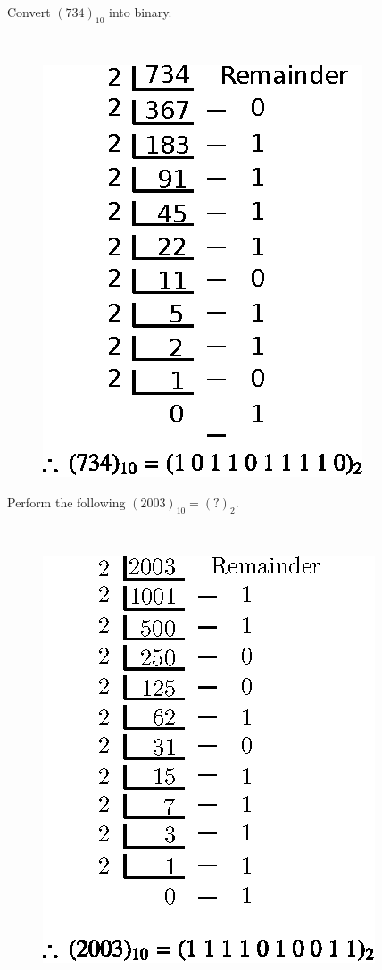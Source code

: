\begin{problem}\label{prob5.4}
Convert $(734)_{10}$ into binary.
\end{problem}

\begin{solution}
~
\begin{figure}[H]
\centering
\includegraphics[scale=.9]{chap5/div3.eps}
\end{figure}
\end{solution}

\begin{problem}\label{prob5.5}
Perform the following $(2003)_{10}=(?)_{2}$.
\end{problem}

\begin{solution}
~
\begin{figure}[H]
\centering
\includegraphics[scale=1.05]{chap5/div4.eps}
\end{figure}
\end{solution}

